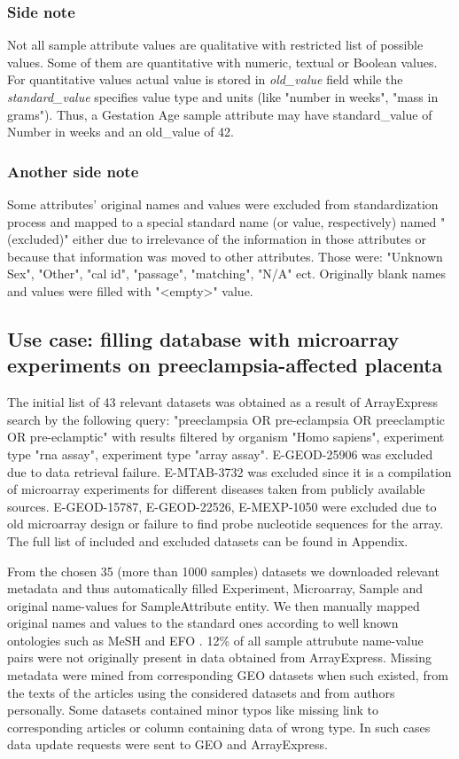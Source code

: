 \documentclass[conference]{IEEEtran}
\begin{document}
\subsubsection{Side note}
Not all sample attribute values are qualitative with restricted list of possible values. Some of them are quantitative with numeric, textual or Boolean values. For quantitative values actual value is stored in \textit{old\_value} field while the \textit{standard\_value} specifies value type and units (like "number in weeks", "mass in grams"). Thus, a Gestation Age sample attribute may have standard\_value of Number in weeks and an old\_value of 42.

\subsubsection{Another side note}
Some attributes' original names and values were excluded from standardization process and mapped to a special standard name (or value, respectively) named "(excluded)" either due to irrelevance of the information in those attributes or because that information was moved to other attributes. Those were: "Unknown Sex", "Other", "cal id", "passage", "matching", "N/A" ect. Originally blank names and values were filled with "\textless empty\textgreater" value.

\subsection{Use case: filling database with microarray experiments on preeclampsia-affected placenta}

The initial list of 43 relevant datasets was obtained as a result of ArrayExpress search by the following query: "preeclampsia OR pre-eclampsia OR preeclamptic OR pre-eclamptic" with results filtered by organism "Homo sapiens", experiment type "rna assay", experiment type "array assay". E-GEOD-25906 was excluded due to data retrieval failure. E-MTAB-3732 was excluded since it is a compilation of microarray experiments for different diseases taken from publicly available sources. E-GEOD-15787, E-GEOD-22526, E-MEXP-1050 were excluded due to old microarray design or failure to find probe nucleotide sequences for the array. The full list of included and excluded datasets can be found in Appendix. 

From the chosen 35 (more than 1000 samples) datasets we downloaded relevant metadata and thus automatically filled Experiment, Microarray, Sample and original name-values for SampleAttribute entity. We then manually mapped original names and values to the standard ones according to well known ontologies such as MeSH and EFO \cite{MeSH,TheExper27:online}. 12\% of all sample attrubute name-value pairs were not originally present in data obtained from ArrayExpress. Missing metadata were mined from corresponding GEO datasets when such existed, from the texts of the articles using the considered datasets and from authors personally. Some datasets contained minor typos like missing link to corresponding articles or column containing data of wrong type. In such cases data update requests were sent to GEO and ArrayExpress.
\end{document}
